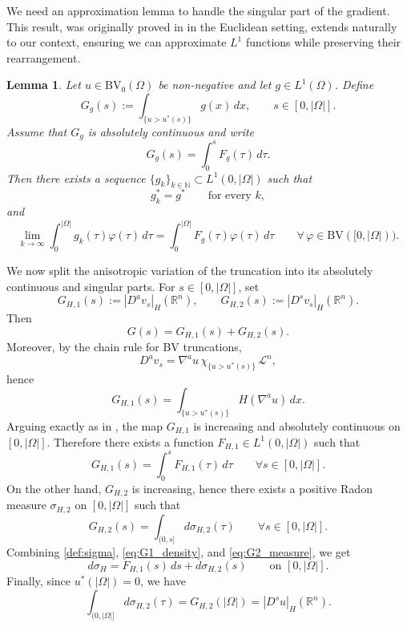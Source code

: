\documentclass[oneside,a4paper,12pt,notitlepage]{article}
\newtheorem{lemma}[theorem]{Lemma}
\theoremstyle{definition}
\newcommand{\R}{\mathbb{R}}
\newcommand{\BV}{\text{BV}}
\begin{document}
We need an approximation lemma to handle the singular part of the gradient. This result, was originally proved in \cite{alvino1978sulle} in the Euclidean setting, extends naturally to our context,  ensuring we can approximate $L^1$ functions while preserving their rearrangement.
\begin{lemma}\label{lem:approximation}
Let \(u\in \BV_0(\Omega)\) be non-negative and let \(g\in L^1(\Omega)\). Define
\[
G_g(s):=\int_{\{u>u^*(s)\}} g(x)\,dx,
\qquad s\in[0,|\Omega|].
\]
Assume that \(G_g\) is absolutely continuous and write
\[
G_g(s)=\int_0^s F_g(\tau)\,d\tau .
\]
Then there exists a sequence \(\{g_k\}_{k\in\mathbb N}\subset L^1(0,|\Omega|)\) such that
\[
g_k^*=g^*
\qquad\text{for every }k,
\]
and
\[
\lim_{k\to\infty}
\int_0^{|\Omega|}g_k(\tau)\varphi(\tau)\,d\tau
=
\int_0^{|\Omega|}F_g(\tau)\varphi(\tau)\,d\tau
\qquad
\forall\,\varphi\in \BV([0,|\Omega|)).
\]
\end{lemma}


We now split the anisotropic variation of the truncation into its absolutely
continuous and singular parts. For $s\in[0,|\Omega|]$, set
\[
G_{H,1}(s):=|D^a v_s|_H(\R^n),
\qquad
G_{H,2}(s):=|D^s v_s|_H(\R^n).
\]
Then
\[
G(s)=G_{H,1}(s)+G_{H,2}(s).
\]
Moreover, by the chain rule for BV truncations,
\[
D^a v_s=\nabla^a u\,\chi_{\{u>u^*(s)\}}\,\mathcal L^n,
\]
hence
\begin{equation}\label{eq:G1_formula}
G_{H,1}(s)=\int_{\{u>u^*(s)\}} H(\nabla^a u)\,dx.
\end{equation}
Arguing exactly as in \cite[Corollary 2.5]{AGNT24}, the map $G_{H,1}$ is increasing
and absolutely continuous on $[0,|\Omega|]$. Therefore there exists a function
$F_{H,1}\in L^1(0,|\Omega|)$ such that
\begin{equation}\label{eq:G1_density}
G_{H,1}(s)=\int_0^s F_{H,1}(\tau)\,d\tau
\qquad \forall s\in[0,|\Omega|].
\end{equation}
On the other hand, $G_{H,2}$ is increasing, hence there exists a positive Radon
measure $\sigma_{H,2}$ on $[0,|\Omega|]$ such that
\begin{equation}\label{eq:G2_measure}
G_{H,2}(s)=\int_{(0,s]} d\sigma_{H,2}(\tau)
\qquad \forall s\in[0,|\Omega|].
\end{equation}
Combining \eqref{def:sigma}, \eqref{eq:G1_density}, and \eqref{eq:G2_measure}, we get
\begin{equation}\label{eq:sigma_decomposition}
d\sigma_H = F_{H,1}(s)\,ds + d\sigma_{H,2}(s)
\qquad \text{on }[0,|\Omega|].
\end{equation}
Finally, since $u^*(|\Omega|)=0$, we have
\begin{equation}\label{eq:sigma2_total_mass}
\int_{(0,|\Omega|]} d\sigma_{H,2}(\tau)
=
G_{H,2}(|\Omega|)
=
|D^s u|_H(\mathbb{R}^n).
\end{equation}
\end{document}
